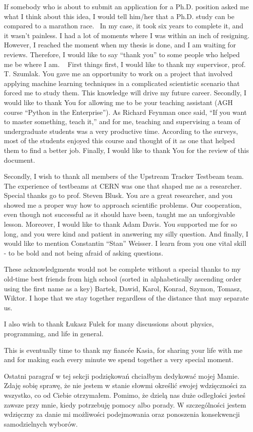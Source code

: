 If somebody who is about to submit an application for a Ph.D. position asked me what I think about this idea, I would tell him/her that a Ph.D. study can be compared to a marathon race.  In my case, it took six years to complete it, and it wasn’t painless. I had a lot of moments where I was within an inch of resigning. However, I reached the moment when my thesis is done, and I am waiting for reviews. Therefore, I would like to say “thank you” to some people who helped me be where I am.
 
First things first, I would like to thank my supervisor, prof. T. Szumlak. You gave me an opportunity to work on a project that involved applying machine learning techniques in a complicated scientistic scenario that forced me to study them. This knowledge will drive my future career. Secondly, I would like to thank You for allowing me to be your teaching assistant (AGH course “Python in the Enterprise”). As Richard Feynman once said, “If you want to master something, teach it,” and for me, teaching and supervising a team of undergraduate students was a very productive time. According to the surveys, most of the students enjoyed this course and thought of it as one that helped them to find a better job. Finally, I would like to thank You for the review of this document. 


Secondly, I wish to thank all members of the Upstream Tracker Testbeam team. The experience of testbeams at CERN was one that shaped me as a researcher. 
Special thanks go to prof. Steven Blusk. You are a great researcher, and you showed me a proper way how to approach scientific problems. Our cooperation, even though not successful as it should have been, taught me an unforgivable lesson. Moreover, I would like to thank Adam Davis. You supported me for so long, and you were kind and patient in answering my silly question. And finally, I would like to mention Constantin “Stan” Weisser. I learn from you one vital skill - to be bold and not being afraid of asking questions. 


These acknowledgments would not be complete without a special thanks to my old-time best friends from high school (sorted in alphabetically ascending order using the first name as a key) Bartek, Dawid, Karol, Konrad, Szymon, Tomasz, Wiktor. I hope that we stay together regardless of the distance that may separate us.

I also wish to thank Łukasz Fulek for many discussions about physics, programming, and life in general. 

This is eventually time to thank my fiancée Kasia, for sharing your life with me  and for making each every minute we spend together a very special moment.  

Ostatni paragraf w tej sekcji podziękowań chciałbym dedykować mojej Mamie. Zdaję sobię sprawę, że nie jestem w stanie słowmi określić swojej wdzięczności za wszystko, co od Ciebie otrzymałem. Pomimo, że dzielą nas duże odległości jesteś zawsze przy mnie, kiedy potrzebuję pomocy albo porady. W szczególności jestem wdzięczny za danie mi możliwości podejmowania oraz ponoszenia konsekwencji samodzielnych wyborów.  

